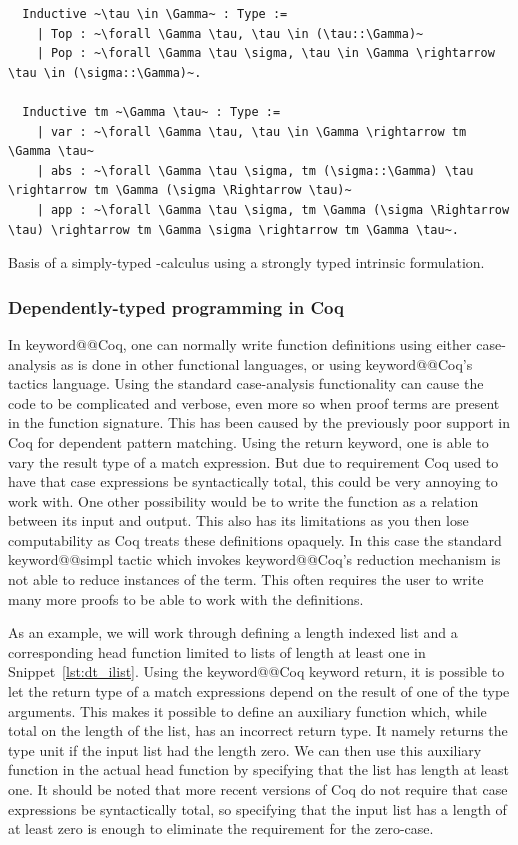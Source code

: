\documentclass[11pt, final]{article}
\makeatletter
\def\<#1>{\csname keyword@@#1\endcsname}
\makeatother
\begin{document}
\begin{listing}[h]
  \begin{verbatim}
  Inductive ~\tau \in \Gamma~ : Type :=
    | Top : ~\forall \Gamma \tau, \tau \in (\tau::\Gamma)~
    | Pop : ~\forall \Gamma \tau \sigma, \tau \in \Gamma \rightarrow \tau \in (\sigma::\Gamma)~.

  Inductive tm ~\Gamma \tau~ : Type :=
    | var : ~\forall \Gamma \tau, \tau \in \Gamma \rightarrow tm \Gamma \tau~
    | abs : ~\forall \Gamma \tau \sigma, tm (\sigma::\Gamma) \tau \rightarrow tm \Gamma (\sigma \Rightarrow \tau)~
    | app : ~\forall \Gamma \tau \sigma, tm \Gamma (\sigma \Rightarrow \tau) \rightarrow tm \Gamma \sigma \rightarrow tm \Gamma \tau~.
  \end{verbatim}
  \caption{Basis of a simply-typed \lambda-calculus using a strongly typed intrinsic formulation.}
  \label{lst:strong_stlc}
\end{listing}

\subsubsection{Dependently-typed programming in Coq}

In \<Coq>, one can normally write function definitions using either case-analysis as is done in other functional languages, or using \<Coq>'s tactics language.
Using the standard case-analysis functionality can cause the code to be complicated and verbose, even more so when proof terms are present in the function signature.
This has been caused by the previously poor support in Coq for dependent pattern matching.
Using the return keyword, one is able to vary the result type of a match expression. But due to requirement Coq used to have that case expressions be syntactically total, this could be very annoying to work with.
One other possibility would be to write the function as a relation between its input and output.
This also has its limitations as you then lose computability as Coq treats these definitions opaquely. In this case the standard \<simpl> tactic which invokes \<Coq>'s reduction mechanism is not able to reduce instances of the term.
This often requires the user to write many more proofs to be able to work with the definitions.

As an example, we will work through defining a length indexed list and a corresponding head function limited to lists of length at least one in Snippet~\ref{lst:dt_ilist}.
Using the \<Coq> keyword return, it is possible to let the return type of a match expressions depend on the result of one of the type arguments.
This makes it possible to define an auxiliary function which, while total on the length of the list, has an incorrect return type. It namely returns the type unit if the input list had the length zero.
We can then use this auxiliary function in the actual head function by specifying that the list has length at least one.
It should be noted that more recent versions of Coq do not require that case expressions be syntactically total, so specifying that the input list has a length of at least zero is enough to eliminate the requirement for the zero-case.
\end{document}

